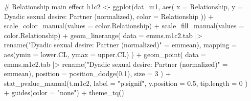 \documentclass[
  bookmarksnumbered]{article}
\newenvironment{Shaded}{\begin{snugshade}}{\end{snugshade}}
\newcommand{\AttributeTok}[1]{\textcolor[rgb]{0.80,0.80,0.80}{#1}}
\newcommand{\CommentTok}[1]{\textcolor[rgb]{0.50,0.62,0.50}{#1}}
\newcommand{\DecValTok}[1]{\textcolor[rgb]{0.86,0.86,0.80}{#1}}
\newcommand{\FloatTok}[1]{\textcolor[rgb]{0.75,0.75,0.82}{#1}}
\newcommand{\FunctionTok}[1]{\textcolor[rgb]{0.94,0.94,0.56}{#1}}
\newcommand{\NormalTok}[1]{\textcolor[rgb]{0.80,0.80,0.80}{#1}}
\newcommand{\OtherTok}[1]{\textcolor[rgb]{0.94,0.94,0.56}{#1}}
\newcommand{\SpecialCharTok}[1]{\textcolor[rgb]{0.86,0.64,0.64}{#1}}
\newcommand{\StringTok}[1]{\textcolor[rgb]{0.80,0.58,0.58}{#1}}
\begin{document}
\begin{Shaded}
\begin{Highlighting}[]
\CommentTok{\# Relationship main effect}
\NormalTok{h1c2 }\OtherTok{\textless{}{-}} \FunctionTok{ggplot}\NormalTok{(dat\_m1, }\FunctionTok{aes}\NormalTok{(}
  \AttributeTok{x =}\NormalTok{ Relationship, }\AttributeTok{y =} \StringTok{\textasciigrave{}}\AttributeTok{Dyadic sexual desire: Partner (normalized)}\StringTok{\textasciigrave{}}\NormalTok{,}
  \AttributeTok{color =}\NormalTok{ Relationship}
\NormalTok{)) }\SpecialCharTok{+}
  \FunctionTok{scale\_color\_manual}\NormalTok{(}\AttributeTok{values =}\NormalTok{ color.Relationship) }\SpecialCharTok{+}
  \FunctionTok{scale\_fill\_manual}\NormalTok{(}\AttributeTok{values =}\NormalTok{ color.Relationship) }\SpecialCharTok{+}
  \FunctionTok{geom\_linerange}\NormalTok{(}
    \AttributeTok{data =}\NormalTok{ emms.m1c2.tab }\SpecialCharTok{|\textgreater{}}
      \FunctionTok{rename}\NormalTok{(}\StringTok{"Dyadic sexual desire: Partner (normalized)"} \OtherTok{=}\NormalTok{ emmean),}
    \AttributeTok{mapping =} \FunctionTok{aes}\NormalTok{(}\AttributeTok{ymin =}\NormalTok{ lower.CL, }\AttributeTok{ymax =}\NormalTok{ upper.CL)}
\NormalTok{  ) }\SpecialCharTok{+}
  \FunctionTok{geom\_point}\NormalTok{(}
    \AttributeTok{data =}\NormalTok{ emms.m1c2.tab }\SpecialCharTok{|\textgreater{}}
      \FunctionTok{rename}\NormalTok{(}\StringTok{"Dyadic sexual desire: Partner (normalized)"} \OtherTok{=}\NormalTok{ emmean),}
    \AttributeTok{position =} \FunctionTok{position\_dodge}\NormalTok{(}\FloatTok{0.1}\NormalTok{),}
    \AttributeTok{size =} \DecValTok{3}
\NormalTok{  ) }\SpecialCharTok{+}
  \FunctionTok{stat\_pvalue\_manual}\NormalTok{(t.m1c2,}
    \AttributeTok{label =} \StringTok{"p.signif"}\NormalTok{,}
    \AttributeTok{y.position =} \FloatTok{0.5}\NormalTok{,}
    \AttributeTok{tip.length =} \DecValTok{0}
\NormalTok{  ) }\SpecialCharTok{+}
  \FunctionTok{guides}\NormalTok{(}\AttributeTok{color =} \StringTok{"none"}\NormalTok{) }\SpecialCharTok{+}
  \FunctionTok{theme\_tq}\NormalTok{()}


\end{Highlighting}
\end{Shaded}
\end{document}
